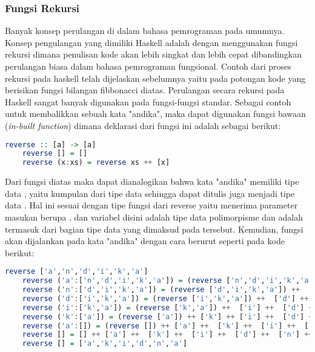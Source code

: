 \documentclass[pi.tex]{subfile}
\begin{document}
  \subsubsection{Fungsi Rekursi}\hspace{8pt}
Banyak konsep perulangan di dalam bahasa pemrograman pada umumnya. Konsep pengulangan yang dimiliki Haskell adalah dengan menggunakan fungsi rekursi dimana penulisan kode akan lebih singkat dan lebih cepat dibandingkan perulangan biasa dalam bahasa pemrograman fungsional. Contoh dari proses rekursi pada haskell telah dijelaskan sebelumnya yaitu pada potongan kode yang berisikan fungsi bilangan fibbonacci diatas. Perulangan secara rekursi pada Haskell sangat banyak digunakan pada fungsi-fungsi standar. Sebagai contoh untuk membalikkan sebuah kata "andika", maka dapat digunakan fungsi bawaan (\emph{in-built function})  dimana deklarasi dari fungsi ini adalah sebagai berikut:\\

  \begin{lstlisting}[language=Haskell]
    reverse :: [a] -> [a]  
    reverse [] = []  
    reverse (x:xs) = reverse xs ++ [x] 
  \end{lstlisting}

  \hspace{8pt}Dari fungsi diatas maka dapat dianalogikan bahwa kata "andika" memiliki tipe data , yaitu kumpulan dari tipe data  sehingga dapat ditulis juga menjadi tipe data \fhaskell{[Char]}. Hal ini sesuai dengan tipe fungsi dari reverse yaitu menerima parameter masukan berupa \fhaskell{[a]}, dan variabel  disini adalah tipe data polimorpisme dan  adalah termasuk dari bagian tipe data yang dimaksud pada  tersebut. Kemudian, fungsi  akan dijalankan pada kata "andika" dengan cara berurut seperti pada kode berikut:\\
  \begin{lstlisting}[language=Haskell]
    reverse ['a','n','d','i','k','a']
    reverse ('a':['n','d','i','k','a']) = (reverse ['n','d','i','k','a']) ++ ['a']
    reverse ('n':['d','i','k','a']) = (reverse ['d','i','k','a']) ++  ['n'] ++  ['a']
    reverse ('d':['i','k','a']) = (reverse ['i','k','a']) ++  ['d'] ++  ['n'] ++  ['a']
    reverse ('i':['k','a']) = (reverse ['k','a']) ++  ['i'] ++  ['d'] ++  ['n'] ++  ['a']
    reverse ('k':['a']) = (reverse ['a']) ++ ['k'] ++ ['i'] ++  ['d'] ++  ['n'] ++ ['a']
    reverse ('a':[]) = (reverse []) ++ ['a'] ++  ['k'] ++  ['i'] ++  ['d'] ++  ['n'] ++  ['a']
    reverse [] = [] ++ ['a'] ++  ['k'] ++  ['i'] ++  ['d'] ++  ['n'] ++  ['a']
    reverse [] = ['a','k','i','d','n','a']
  \end{lstlisting}
\end{document}
